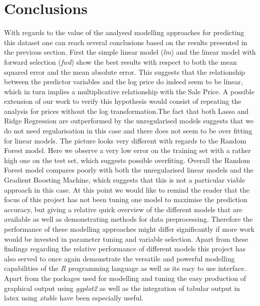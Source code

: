 \section{Conclusions}
With regards to the value of the analysed modelling approaches for predicting this dataset one can reach several conclusions based on the results presented in the previous section. First the simple linear model (\textit{lm}) and the linear model with forward selection (\textit{fwd}) show the best results with respect to both the mean squared error and the mean absolute error. This suggests that the relationship between the predictor variables and the log price do indeed seem to be linear, which in turn implies a multiplicative relationship with the Sale Price. A possible extension of our work to verify this hypothesis would consist of repeating the analysis for prices without the log transformation.The fact that both Lasso and Ridge Regression are outperformed by the unregularised models suggests that we do not need regularisation in this case and there does not seem to be over fitting for linear models. The picture looks very different with regards to the Random Forest model. Here we observe a very low error on the training set with a rather high one on the test set, which suggests possible overfiting. Overall the Random Forest model compares poorly with both the unregularised linear models and the Gradient Boosting Machine, which suggests that this is not a particular viable approach in this case. At this point we would like to remind the reader that the focus of this project has not been tuning one model to maximise the prediction accuracy, but giving a relative quick overview of the different models that are available as well as demonstrating methods for data preprocessing. Therefore the performance of these modelling approaches might differ significantly if more work would be invested in parameter tuning and variable selection.
Apart from these findings regarding the relative performance of different models this project has also served to once again demonstrate the versatile and powerful modelling capabilities of the \textit{R} programming language as well as its easy to use interface. Apart from the packages used for modelling and tuning the easy production of graphical output using \textit{ggplot2}  as well as the integration of tabular output in latex using \textit{xtable} have been especially useful. 